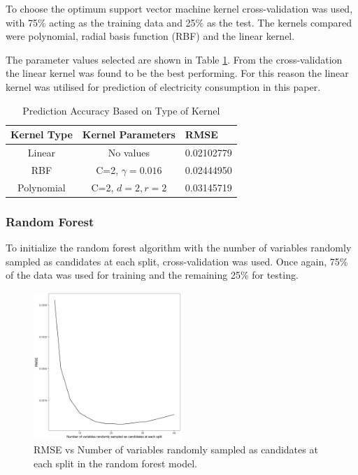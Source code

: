 To choose the optimum support vector machine kernel cross-validation was used, with 75\% acting as the training data and 25\% as the test. The kernels compared were polynomial, radial basis function (RBF) and the linear kernel.

The parameter values selected are shown in Table \ref{tab:kernel}. From the cross-validation the linear kernel was found to be the best performing. For this reason the linear kernel was utilised for prediction of electricity consumption in this paper.

\begin{table}
	\caption{Prediction Accuracy Based on Type of Kernel}
	\label{tab:kernel}
	\begin{tabular}{ccl}
		\toprule
		Kernel Type& Kernel Parameters & RMSE\\
		\midrule
		Linear & No values & 0.02102779\\
		RBF & C=2, $\gamma=0.016$ & 0.02444950\\
		Polynomial & C=2, $d=2, r=2$ & 0.03145719 \\
		\bottomrule
	\end{tabular}
\end{table}


\subsubsection{Random Forest}

To initialize the random forest algorithm with the number of variables randomly sampled as candidates at each split, cross-validation was used. Once again, 75\% of the data was used for training and the remaining 25\% for testing.

\begin{figure}
	\includegraphics[width=0.5\textwidth]{Chapter5/figures/rforest_parameter_tuning}
	\caption{RMSE vs Number of variables randomly sampled as candidates at each split in the random forest model.}
	\label{fig:rf_param_tune}
\end{figure}



